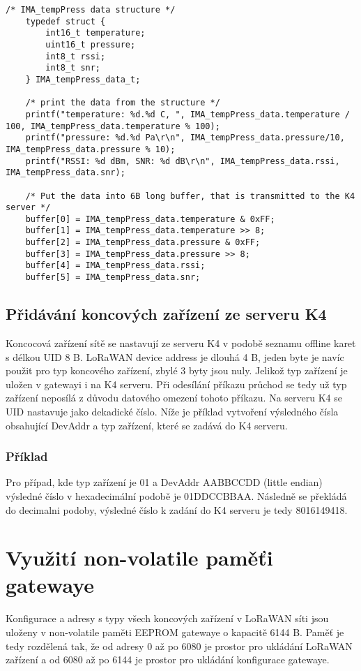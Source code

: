 \begin{lstlisting}[style=CStyle]
    /* IMA_tempPress data structure */   
    typedef struct {
        int16_t temperature;
        uint16_t pressure;
        int8_t rssi;
        int8_t snr;
    } IMA_tempPress_data_t;
    
    /* print the data from the structure */
    printf("temperature: %d.%d C, ", IMA_tempPress_data.temperature / 100, IMA_tempPress_data.temperature % 100);
    printf("pressure: %d.%d Pa\r\n", IMA_tempPress_data.pressure/10, IMA_tempPress_data.pressure % 10);
    printf("RSSI: %d dBm, SNR: %d dB\r\n", IMA_tempPress_data.rssi, IMA_tempPress_data.snr);

    /* Put the data into 6B long buffer, that is transmitted to the K4 server */
    buffer[0] = IMA_tempPress_data.temperature & 0xFF;
    buffer[1] = IMA_tempPress_data.temperature >> 8;
    buffer[2] = IMA_tempPress_data.pressure & 0xFF;
    buffer[3] = IMA_tempPress_data.pressure >> 8;
    buffer[4] = IMA_tempPress_data.rssi;
    buffer[5] = IMA_tempPress_data.snr;
\end{lstlisting}


\subsection{Přidávání koncových zařízení ze serveru K4}
Koncocová zařízení sítě se nastavují ze serveru K4 v podobě seznamu offline karet s délkou UID 8 B.
LoRaWAN device address je dlouhá 4 B, jeden byte je navíc použit pro typ koncového zařízení, zbylé 3 byty jsou nuly.
Jelikož typ zařízení je uložen v gatewayi i na K4 serveru. Při odesílání příkazu průchod se tedy už typ zařízení neposílá z důvodu datového omezení tohoto příkazu.
Na serveru K4 se UID nastavuje jako dekadické číslo.
Níže je příklad vytvoření výsledného čísla obsahující DevAddr a typ zařízení, které se zadává do K4 serveru.

\subsubsection{Příklad}
Pro případ, kde typ zařízení je 01 a DevAddr AABBCCDD (little endian) výsledné číslo v hexadecimální podobě je 01DDCCBBAA. Následně se překládá do decimalni podoby, výsledné číslo k zadání do K4 serveru je tedy 8016149418.


\section{Využití non-volatile paměťi gatewaye}
Konfigurace a adresy s typy všech koncových zařízení v LoRaWAN síti jsou uloženy v non-volatile paměti EEPROM gatewaye o kapacitě 6144 B. 
Paměť je tedy rozdělená tak, že od adresy 0 až po 6080 je prostor pro ukládání LoRaWAN zařízení a od 6080 až po 6144 je prostor pro ukládání konfigurace gatewaye.

